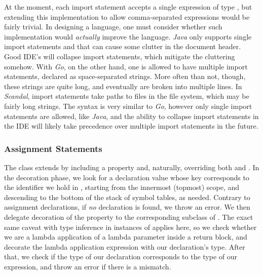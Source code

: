 At the moment, each import statement accepts a single expression of type , but extending this implementation to allow comma-separated expressions would be fairly trivial. In designing a language, one must consider whether such implementation would \emph{actually} improve the language. \emph{Java} only supports single import statements and that can cause some clutter in the document header. Good IDE's will collapse import statements, which mitigate the cluttering somehow. With \emph{Go}, on the other hand, one is allowed to have multiple import statements, declared as space-separated strings. More often than not, though, these strings are quite long, and eventually are broken into multiple lines. In \emph{Scandal}, import statements take paths to files in the file system, which may be fairly long strings. The syntax is very similar to \emph{Go}, however only single import statements are allowed, like \emph{Java}, and the ability to collapse import statements in the IDE will likely take precedence over multiple import statements in the future.

\subsubsection{Assignment Statements}

The  class extends  by including a  property and, naturally, overriding both  and . In the decoration phase, we look for a declaration value whose key corresponds to the identifier we hold in , starting from the innermost (topmost) scope, and descending to the bottom of the stack of symbol tables, as needed. Contrary to assignment declarations, if \emph{no} declaration is found, we throw an error. We then delegate decoration of the  property to the corresponding subclass of . The exact same caveat with type inference in instances of  applies here, so we check whether we are a lambda application of a lambda parameter inside a return block, and decorate the lambda application expression with our declaration's type. After that, we check if the type of our declaration corresponds to the type of our expression, and throw an error if there is a mismatch.

